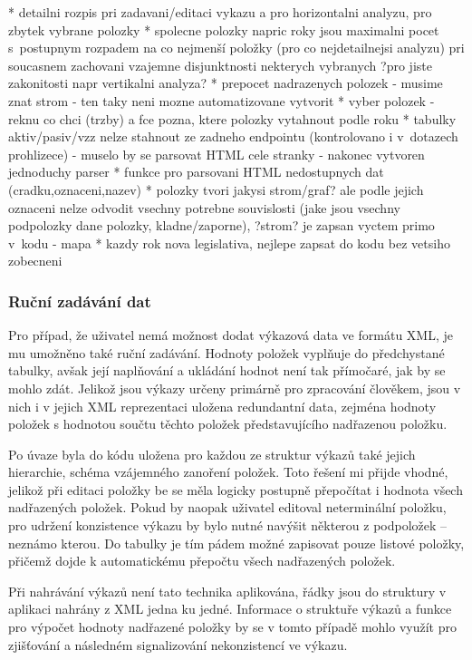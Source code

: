 * detailni rozpis pri zadavani/editaci vykazu a pro horizontalni analyzu, pro zbytek vybrane polozky
* spolecne polozky napric roky jsou maximalni pocet s~postupnym rozpadem na co nejmenší položky (pro co nejdetailnejsi analyzu) pri soucasnem zachovani vzajemne disjunktnosti nekterych vybranych ?pro jiste zakonitosti napr vertikalni analyza?
* prepocet nadrazenych polozek - musime znat strom - ten taky neni mozne automatizovane vytvorit
* vyber polozek - reknu co chci (trzby) a fce pozna, ktere polozky vytahnout podle roku
* tabulky aktiv/pasiv/vzz nelze stahnout ze zadneho endpointu (kontrolovano i v~dotazech prohlizece) - muselo by se parsovat HTML cele stranky - nakonec vytvoren jednoduchy parser
* funkce pro parsovani HTML nedostupnych dat (cradku,oznaceni,nazev)
* polozky tvori jakysi strom/graf? ale podle jejich oznaceni nelze odvodit vsechny potrebne souvislosti (jake jsou vsechny podpolozky dane polozky, kladne/zaporne), ?strom? je zapsan vyctem primo v~kodu - mapa
* kazdy rok nova legislativa, nejlepe zapsat do kodu bez vetsiho zobecneni

\subsubsection{Ruční zadávání dat}
Pro případ, že uživatel nemá možnost dodat výkazová data ve formátu XML, je mu umožněno také ruční zadávání. Hodnoty položek vyplňuje do předchystané tabulky, avšak její naplňování a ukládání hodnot není tak přímočaré, jak by se mohlo zdát. Jelikož jsou výkazy určeny primárně pro zpracování člověkem, jsou v nich i v jejich XML reprezentaci uložena redundantní data, zejména hodnoty položek s hodnotou součtu těchto položek představujícího nadřazenou položku. 

Po úvaze byla do kódu uložena pro každou ze struktur výkazů také jejich hierarchie, schéma vzájemného zanoření položek. Toto řešení mi přijde vhodné, jelikož při editaci položky be se měla logicky postupně přepočítat i hodnota všech nadřazených položek. Pokud by naopak uživatel editoval neterminální položku, pro udržení konzistence výkazu by bylo nutné navýšit některou z podpoložek -- neznámo kterou. Do tabulky je tím pádem možné zapisovat pouze listové položky, přičemž dojde k automatickému přepočtu všech nadřazených položek.

Při nahrávání výkazů není tato technika aplikována, řádky jsou do struktury v aplikaci nahrány z XML jedna ku jedné. Informace o struktuře výkazů a funkce pro výpočet hodnoty nadřazené položky by se v tomto případě mohlo využít pro zjišťování a následném signalizování nekonzistencí ve výkazu.


